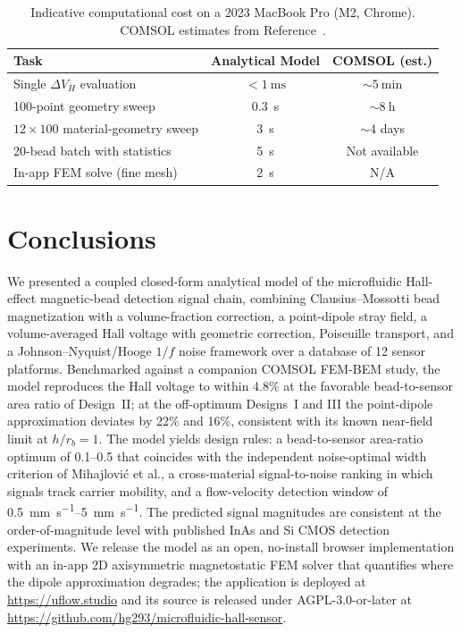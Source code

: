 \documentclass[micromachines,article,submit,pdftex,moreauthors]{Definitions/mdpi}
\begin{document}
\begin{table}[H]
\caption{Indicative computational cost on a 2023 MacBook Pro (M2, Chrome). COMSOL
estimates from Reference~\cite{govindaraju2025}.\label{tab:performance}}
\begin{tabularx}{\textwidth}{Xcc}
\toprule
\textbf{Task} & \textbf{Analytical Model} & \textbf{COMSOL (est.)} \\
\midrule
Single $\Delta V_H$ evaluation        & ${<}\SI{1}{\milli\second}$ & ${\sim}\SI{5}{\minute}$ \\
100-point geometry sweep              & \SI{0.3}{\second}          & ${\sim}\SI{8}{\hour}$ \\
$12 \times 100$ material-geometry sweep & \SI{3}{\second}          & ${\sim}4$ days \\
20-bead batch with statistics         & \SI{5}{\second}            & Not available \\
In-app FEM solve (fine mesh)          & \SI{2}{\second}            & N/A \\
\bottomrule
\end{tabularx}
\end{table}

\section{Conclusions}
\label{sec:conclusions}

We presented a coupled closed-form analytical model of the microfluidic Hall-effect
magnetic-bead detection signal chain, combining Clausius--Mossotti bead magnetization
with a volume-fraction correction, a point-dipole stray field, a volume-averaged Hall
voltage with geometric correction, Poiseuille transport, and a Johnson--Nyquist/Hooge
$1/f$ noise framework over a database of 12 sensor platforms. Benchmarked against a
companion COMSOL FEM-BEM study, the model reproduces the Hall voltage to within 4.8\%
at the favorable bead-to-sensor area ratio of Design~II; at the off-optimum Designs~I
and III the point-dipole approximation deviates by 22\% and 16\%, consistent with its
known near-field limit at $h/r_b = 1$. The model yields design rules: a bead-to-sensor
area-ratio optimum of 0.1--0.5 that coincides with the independent noise-optimal width
criterion of Mihajlovi\'{c} et al., a cross-material signal-to-noise ranking in which
signals track carrier mobility, and a flow-velocity detection window of
\SIrange{0.5}{5}{\milli\meter\per\second}. The predicted signal magnitudes are
consistent at the order-of-magnitude level with published InAs and Si CMOS detection
experiments. We release the model as an open, no-install browser implementation with
an in-app 2D axisymmetric magnetostatic FEM solver that quantifies where the dipole
approximation degrades; the application is deployed at \url{https://uflow.studio} and
its source is released under AGPL-3.0-or-later at
\url{https://github.com/hg293/microfluidic-hall-sensor}.
\end{document}
